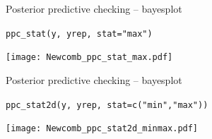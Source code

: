 \documentclass[t]{beamer}
\begin{document}
\begin{frame}{Posterior predictive checking -- bayesplot}

  \vspace{-1\baselineskip}
  \texttt{ppc\_stat(y, yrep, stat="max")}
  
  \texttt{[image: Newcomb\_ppc\_stat\_max.pdf]}

\end{frame}

\begin{frame}{Posterior predictive checking -- bayesplot}

  \vspace{-1\baselineskip}
  \texttt{ppc\_stat2d(y, yrep, stat=c("min","max"))}
  
  \texttt{[image: Newcomb\_ppc\_stat2d\_minmax.pdf]}

\end{frame}





  

  



  
\end{document}
